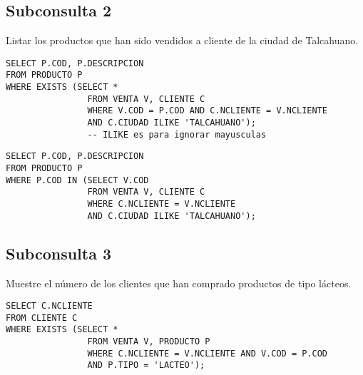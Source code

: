 \documentclass{templateNote}
\begin{document}
\subsection{Subconsulta 2}
Listar los productos que han sido vendidos a cliente de la ciudad de Talcahuano.
\begin{tcolorbox}
    [colback=gray!5!white,colframe=gray!75!black,fonttitle=\bfseries,title=SQL]
    \begin{sqlcode}
    \end{sqlcode}
    \begin{verbatim}
SELECT P.COD, P.DESCRIPCION
FROM PRODUCTO P
WHERE EXISTS (SELECT *
                FROM VENTA V, CLIENTE C
                WHERE V.COD = P.COD AND C.NCLIENTE = V.NCLIENTE
                AND C.CIUDAD ILIKE 'TALCAHUANO');
                -- ILIKE es para ignorar mayusculas
    \end{verbatim}
\end{tcolorbox}

\begin{tcolorbox}
    [colback=gray!5!white,colframe=gray!75!black,fonttitle=\bfseries,title=SQL]
    \begin{sqlcode}
    \end{sqlcode}
    \begin{verbatim}
SELECT P.COD, P.DESCRIPCION
FROM PRODUCTO P
WHERE P.COD IN (SELECT V.COD
                FROM VENTA V, CLIENTE C
                WHERE C.NCLIENTE = V.NCLIENTE 
                AND C.CIUDAD ILIKE 'TALCAHUANO');
    \end{verbatim}
\end{tcolorbox}

\newpage
\subsection{Subconsulta 3}
Muestre el número de los clientes que han comprado productos de tipo lácteos.
\begin{tcolorbox}
    [colback=gray!5!white,colframe=gray!75!black,fonttitle=\bfseries,title=SQL]
    \begin{sqlcode}
    \end{sqlcode}
    \begin{verbatim}
SELECT C.NCLIENTE
FROM CLIENTE C
WHERE EXISTS (SELECT *
                FROM VENTA V, PRODUCTO P
                WHERE C.NCLIENTE = V.NCLIENTE AND V.COD = P.COD
                AND P.TIPO = 'LACTEO');
    \end{verbatim}
\end{tcolorbox}
\end{document}
